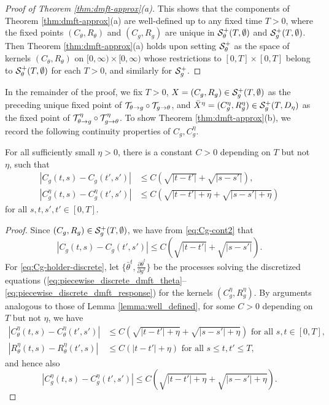 \begin{proof}[Proof of Theorem \ref{thm:dmft-approx}(a)]
This shows that the components of Theorem \ref{thm:dmft-approx}(a) are 
well-defined up to any fixed time $T>0$, where the fixed points
$(C_\theta,R_\theta)$ and $(C_g,R_g)$ are unique in
$\mathcal{S}_\theta^+(T,\emptyset)$ and
$\mathcal{S}_g^+(T,\emptyset)$. Then Theorem \ref{thm:dmft-approx}(a) holds upon setting
$\mathcal{S}_\theta^+$ as the space of kernels
$(C_\theta,R_\theta)$ on $[0,\infty) \times [0,\infty)$ whose
restrictions to $[0,T] \times [0,T]$ belong to $\mathcal{S}_\theta^+(T,\emptyset)$ for
each $T>0$, and similarly for $\mathcal{S}_g^+$.
\end{proof}

In the remainder of the proof, we fix $T>0$,
$X=(C_g,R_g) \in \mathcal{S}_g^+(T,\emptyset)$ as
the preceding unique fixed point of $\mathcal{T}_{\theta \to g} \circ \mathcal{T}_{g \to
\theta}$, and $\bar X^\eta=(C_g^\eta,R_g^\eta) \in \mathcal{S}_g^+(T,D_\eta)$ as the
fixed point of $\mathcal{T}_{\theta \to g}^\eta \circ \mathcal{T}_{g \to
\theta}^\eta$. To show Theorem \ref{thm:dmft-approx}(b), we record the following
continuity properties of $C_g,C_g^\eta$.
 
\begin{lemma}\label{lem:discrete_dmft_approx_continue}
For all sufficiently small \(\eta>0\),
there is a constant $C>0$ depending on $T$ but not $\eta$, such that 
\begin{align}
  |C_g(t,s)-C_g(t',s')|
  &\le
  C\left(\sqrt{|t-t'|}+\sqrt{|s-s'|}\right),
  \label{eq:Cg-holder-cont}\\
  |C_g^\eta(t,s)-C_g^\eta(t',s')|
  &\le
  C\left(\sqrt{|t-t'|+\eta}+\sqrt{|s-s'|+\eta}\right)
  \label{eq:Cg-holder-discrete}
\end{align}
for all \(s,t,s',t'\in[0,T]\).
\end{lemma}
\begin{proof}
Since $(C_g,R_g) \in \mathcal{S}_g^+(T,\emptyset)$, we have from \eqref{eq:Cg-cont2} that
\[
  |C_g(t,s)-C_g(t',s')|
  \leq
  C\left(\sqrt{|t-t'|}+\sqrt{|s-s'|}\right).
\]
For \eqref{eq:Cg-holder-discrete}, let $\{\bar \theta^t,\frac{\partial
\bar \theta^t}{\partial g^s}\}$ be the processes solving the discretized
equations
(\ref{eq:piecewise_discrete_dmft_theta}--\ref{eq:piecewise_discrete_dmft_response})
for the kernels $(C_g^\eta,R_g^\eta)$. By arguments analogous to those of
Lemma \ref{lemma:well_defined},
for some $C>0$ depending on $T$ but not $\eta$, we have  
\begin{align*}
|C_\theta^\eta(t,s)-C_\theta^\eta(t',s')|
&\leq C(\sqrt{|t-t'|+\eta}+\sqrt{|s-s'|+\eta}) \text{ for all } s,t \in
[0,T],\\
|R_\theta^\eta(t,s)-R_\theta^\eta(t',s)| &\le C(|t-t'|+\eta)
\text{ for all } s \leq t,t' \leq T,
\end{align*}
and hence also  
\[|C_g^\eta(t,s)-C_g^\eta(t',s')|
  \leq
  C\left(\sqrt{|t-t'|+\eta}+\sqrt{|s-s'|+\eta}\right).\]
\end{proof}

